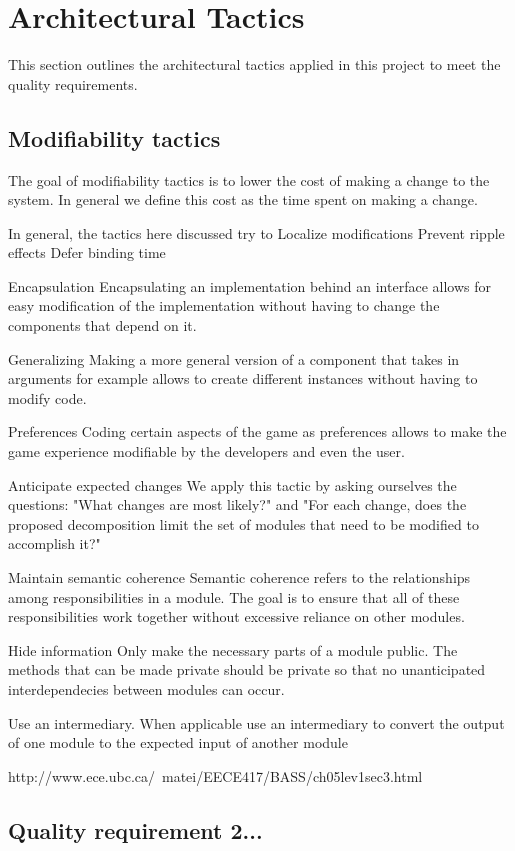 \section{Architectural Tactics}
This section outlines the architectural tactics applied in this project to meet the quality requirements.

	\subsection{Modifiability tactics}
	The goal of modifiability tactics is to lower the cost of making a change to the system. In general we define this cost as the time spent on making a change.
	
	In general, the tactics here discussed try to
	Localize modifications
	Prevent ripple effects
	Defer binding time
	
	Encapsulation
	Encapsulating an implementation behind an interface allows for easy modification of the implementation without having to change the components that depend on it.
	
	Generalizing
	Making a more general version of a component that takes in arguments for example allows to create different instances without having to modify code.
	
	Preferences
	Coding certain aspects of the game as preferences allows to make the game experience modifiable by the developers and even the user.
	
	Anticipate expected changes
	We apply this tactic by asking ourselves the questions: "What changes are most likely?" and "For each change, does the proposed decomposition limit the set of modules that need to be modified to accomplish it?"
	
	Maintain semantic coherence
	Semantic coherence refers to the relationships among responsibilities in a module. The goal is to ensure that all of these responsibilities work together without excessive reliance on other modules. 
	
	Hide information
	Only make the necessary parts of a module public. The methods that can be made private should be private so that no unanticipated interdependecies between modules can occur.
	
	Use an intermediary.
	When applicable use an intermediary to convert the output of one module to the expected input of another module

	http://www.ece.ubc.ca/~matei/EECE417/BASS/ch05lev1sec3.html
	
		
	\subsection{Quality requirement 2...}
